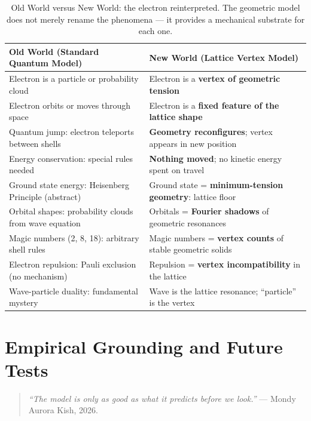 \documentclass[11pt, letterpaper, openany]{book}
\begin{document}
\begin{table}[H]
\centering
\renewcommand{\arraystretch}{1.6}
\small
\begin{tabular}{|p{6cm}|p{6cm}|}
\hline
\rowcolor{goldseal!10}
\textbf{Old World (Standard Quantum Model)} &
\textbf{New World (Lattice Vertex Model)} \\
\hline\hline
Electron is a particle or probability cloud &
Electron is a \textbf{vertex of geometric tension} \\
\hline
Electron orbits or moves through space &
Electron is a \textbf{fixed feature of the lattice shape} \\
\hline
Quantum jump: electron teleports between shells &
\textbf{Geometry reconfigures}; vertex appears in new position \\
\hline
Energy conservation: special rules needed &
\textbf{Nothing moved}; no kinetic energy spent on travel \\
\hline
Ground state energy: Heisenberg Principle (abstract) &
Ground state = \textbf{minimum-tension geometry}: lattice floor \\
\hline
Orbital shapes: probability clouds from wave equation &
Orbitals = \textbf{Fourier shadows} of geometric resonances \\
\hline
Magic numbers (2, 8, 18): arbitrary shell rules &
Magic numbers = \textbf{vertex counts} of stable geometric solids \\
\hline
Electron repulsion: Pauli exclusion (no mechanism) &
Repulsion = \textbf{vertex incompatibility} in the lattice \\
\hline
Wave-particle duality: fundamental mystery &
Wave is the lattice resonance; ``particle'' is the vertex \\
\hline
\end{tabular}
\caption{Old World versus New World: the electron reinterpreted.
The geometric model does not merely rename the phenomena — it
provides a mechanical substrate for each one.}
\end{table}

\clearpage

\chapter{Empirical Grounding and Future Tests}

\begin{quote}
\textit{``The model is only as good as what it predicts before we look.''}
--- Mondy Aurora Kish, 2026.
\end{quote}
\end{document}
